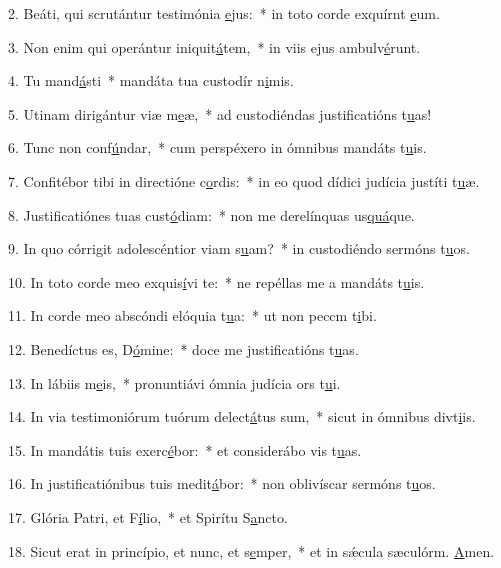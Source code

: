 2. Beáti, qui scrutántur testimónia \uline{e}jus:~* in toto corde exquírnt \uline{e}um.\par 
3. Non enim qui operántur iniquit\uline{á}tem,~* in viis ejus ambulv\uline{é}runt.\par 
4. Tu mand\uline{á}sti~* mandáta tua custodír n\uline{i}mis.\par 
5. Utinam dirigántur viæ m\uline{e}æ,~* ad custodiéndas justificatións t\uline{u}as!\par 
6. Tunc non conf\uline{ú}ndar,~* cum perspéxero in ómnibus mandáts t\uline{u}is.\par 
7. Confitébor tibi in directióne c\uline{o}rdis:~* in eo quod dídici judícia justíti t\uline{u}æ.\par 
8. Justificatiónes tuas cust\uline{ó}diam:~* non me derelínquas us\uline{quá}que.\par 
9. In quo córrigit adolescéntior viam s\uline{u}am?~* in custodiéndo sermóns t\uline{u}os.\par 
10. In toto corde meo exquis\uline{í}vi te:~* ne repéllas me a mandáts t\uline{u}is.\par 
11. In corde meo abscóndi elóquia t\uline{u}a:~* ut non peccm t\uline{i}bi.\par 
12. Benedíctus es, D\uline{ó}mine:~* doce me justificatións t\uline{u}as.\par 
13. In lábiis m\uline{e}is,~* pronuntiávi ómnia judícia ors t\uline{u}i.\par 
14. In via testimoniórum tuórum delect\uline{á}tus sum,~* sicut in ómnibus divt\uline{i}is.\par 
15. In mandátis tuis exerc\uline{é}bor:~* et considerábo vis t\uline{u}as.\par 
16. In justificatiónibus tuis medit\uline{á}bor:~* non oblivíscar sermóns t\uline{u}os.\par 
17. Glória Patri, et F\uline{í}lio,~* et Spirítu S\uline{a}ncto.\par 
18. Sicut erat in princípio, et nunc, et s\uline{e}mper,~* et in sǽcula sæculórm. \uline{A}men.\par 
